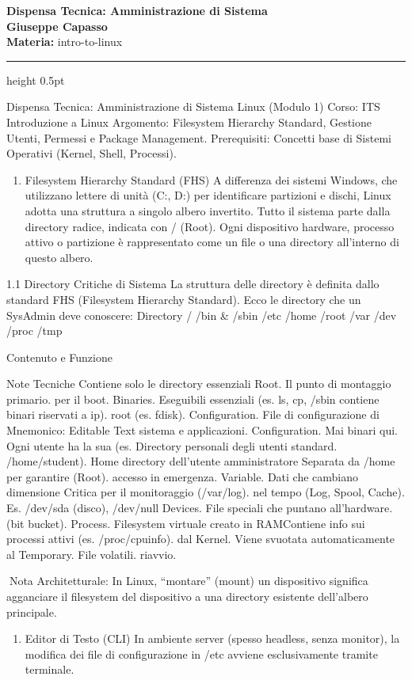 \documentclass[11pt,a4paper]{article}
\providecommand{\tightlist}{%
  \setlength{\itemsep}{0pt}\setlength{\parskip}{0pt}}
\newcommand{\proposaltitle}[1]{
    \begin{center}
        \vspace*{0.1cm}
        {\LARGE \bfseries \color{blue} #1} \\[1.5ex]
        {\large \textbf{Giuseppe Capasso}} \\[1ex]
                \small{
            \vspace{0.1cm}
            \textbf{Materia:} intro-to-linux\\
        }
            \end{center}
    \vspace{0.3cm}
    \hrule height 0.5pt
    \vspace{0.5cm}
}
\begin{document}
\proposaltitle{Dispensa Tecnica: Amministrazione di Sistema}

Dispensa Tecnica: Amministrazione di Sistema Linux (Modulo 1) Corso: ITS
Introduzione a Linux Argomento: Filesystem Hierarchy Standard, Gestione
Utenti, Permessi e Package Management. Prerequisiti: Concetti base di
Sistemi Operativi (Kernel, Shell, Processi).

\begin{enumerate}
\def\labelenumi{\arabic{enumi}.}
\tightlist
\item
  Filesystem Hierarchy Standard (FHS) A differenza dei sistemi Windows,
  che utilizzano lettere di unità (C:, D:) per identificare partizioni e
  dischi, Linux adotta una struttura a singolo albero invertito. Tutto
  il sistema parte dalla directory radice, indicata con / (Root). Ogni
  dispositivo hardware, processo attivo o partizione è rappresentato
  come un file o una directory all'interno di questo albero.
\end{enumerate}

1.1 Directory Critiche di Sistema La struttura delle directory è
definita dallo standard FHS (Filesystem Hierarchy Standard). Ecco le
directory che un SysAdmin deve conoscere: Directory / /bin \& /sbin /etc
/home /root /var /dev /proc /tmp

Contenuto e Funzione

Note Tecniche Contiene solo le directory essenziali Root. Il punto di
montaggio primario. per il boot. Binaries. Eseguibili essenziali (es.
ls, cp, /sbin contiene binari riservati a ip). root (es. fdisk).
Configuration. File di configurazione di Mnemonico: Editable Text
sistema e applicazioni. Configuration. Mai binari qui. Ogni utente ha la
sua (es. Directory personali degli utenti standard. /home/student). Home
directory dell'utente amministratore Separata da /home per garantire
(Root). accesso in emergenza. Variable. Dati che cambiano dimensione
Critica per il monitoraggio (/var/log). nel tempo (Log, Spool, Cache).
Es. /dev/sda (disco), /dev/null Devices. File speciali che puntano
all'hardware. (bit bucket). Process. Filesystem virtuale creato in
RAMContiene info sui processi attivi (es. /proc/cpuinfo). dal Kernel.
Viene svuotata automaticamente al Temporary. File volatili. riavvio.

Nota Architetturale: In Linux, ``montare'' (mount) un dispositivo
significa agganciare il filesystem del dispositivo a una directory
esistente dell'albero principale.

\begin{enumerate}
\def\labelenumi{\arabic{enumi}.}
\setcounter{enumi}{1}
\tightlist
\item
  Editor di Testo (CLI) In ambiente server (spesso headless, senza
  monitor), la modifica dei file di configurazione in /etc avviene
  esclusivamente tramite terminale.
\end{enumerate}
\end{document}
